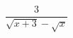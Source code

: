 \hspace*{2mm}\begin{minipage}[t]{\dimexpr\linewidth-2mm\relax}\vspace{0pt}
$\dfrac{3}{\sqrt{x+3}-\sqrt{x}}$\end{minipage}
